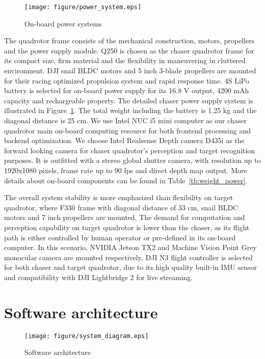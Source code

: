 \begin{figure}[ht]
  \centering
  \texttt{[image: figure/power\_system.eps]}
  \caption{On-board power systems}
  \label{fig:power_systems}
\end{figure}

The quadrotor frame consists of the mechanical construction, motors, propellers and the power supply module. Q250 is chosen as the chaser quadrotor frame for its compact size, firm material and the flexibility in maneuvering in cluttered environment. DJI snail BLDC motors and 5 inch 3-blade propellers are mounted for their racing optimized propulsion system and rapid response time. 4S LiPo battery is selected for on-board power supply for its 16.8 V output, 4200 mAh capacity and rechargeable property. The detailed chaser power supply system is illustrated in Figure~\ref{fig:power_systems}. The total weight including the battery is 1.25 kg and the diagonal distance is 25 cm. We use Intel NUC i5 mini computer as our chaser quadrotor main on-board computing resource for both frontend processing and backend optimization. We choose Intel Realsense Depth camera D435i as the forward looking camera for chaser quadrotor's perception and target recognition purposes. It is outfitted with a stereo global shutter camera, with resolution up to 1920x1080 pixels, frame rate up to 90 fps and direct depth map output. More details about on-board components can be found in Table~\ref{tb:weight_power}.

The overall system stability is more emphasized than flexibility on target quadrotor, where F330 frame with diagonal distance of 33 cm, snail BLDC motors and 7 inch propellers are mounted. The demand for computation and perception capability on target quadrotor is lower than the chaser, as its flight path is either controlled by human operator or pre-defined in its on-board computer. In this scenario, NVIDIA Jetson TX2 and Machine Vision Point Grey monocular camera are mounted respectively. DJI N3 flight controller is selected for both chaser and target quadrotor, due to its high quality built-in IMU sensor and compatibility with DJI Lightbridge 2 for live streaming.

\section{Software architecture}\label{software}

\begin{figure}[ht]
  \centering
  \texttt{[image: figure/system\_diagram.eps]}
  \caption{Software architecture}
  \label{fig:software_architecture}
\end{figure}

